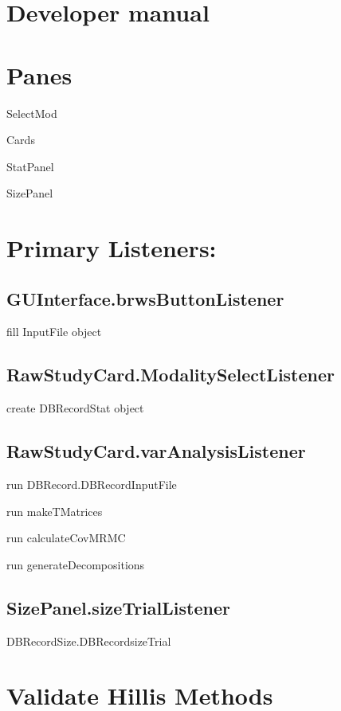 \documentclass{article}%
\begin{document}
\bigskip

\section{\bigskip Developer manual}

\bigskip

\section{Panes}

SelectMod

Cards

StatPanel

SizePanel

\section{Primary Listeners:}

\subsection{GUInterface.brwsButtonListener}

\qquad fill InputFile object

\subsection{RawStudyCard.ModalitySelectListener}

\qquad create DBRecordStat object\bigskip

\subsection{RawStudyCard.varAnalysisListener}

\qquad run DBRecord.DBRecordInputFile

\qquad\qquad run makeTMatrices

\qquad\qquad run calculateCovMRMC

\qquad\qquad run generateDecompositions

\subsection{SizePanel.sizeTrialListener}

\qquad DBRecordSize.DBRecordsizeTrial

\section{Validate Hillis Methods}
\end{document}
